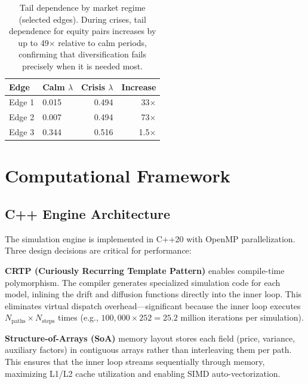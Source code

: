 \documentclass[11pt,a4paper]{article}
\begin{document}
\begin{table}[H]
\centering
\caption{Tail dependence by market regime (selected edges). During crises, tail dependence for equity pairs increases by up to 49$\times$ relative to calm periods, confirming that diversification fails precisely when it is needed most.}
\label{tab:regime_copula}
\small
\begin{tabular}{@{}llrr@{}}
\toprule
\textbf{Edge} & \textbf{Calm $\lambda$} & \textbf{Crisis $\lambda$} & \textbf{Increase} \\
\midrule
Edge 1 & 0.015 & 0.494 & 33$\times$ \\
Edge 2 & 0.007 & 0.494 & 73$\times$ \\
Edge 3 & 0.344 & 0.516 & 1.5$\times$ \\
\bottomrule
\end{tabular}
\end{table}


\section{Computational Framework}
\label{sec:engine}

\subsection{C++ Engine Architecture}
\label{sec:cpp}

The simulation engine is implemented in C++20 with OpenMP parallelization.
Three design decisions are critical for performance:

\textbf{CRTP (Curiously Recurring Template Pattern)} enables compile-time polymorphism.
The compiler generates specialized simulation code for each model, inlining the drift and diffusion functions directly into the inner loop.
This eliminates virtual dispatch overhead---significant because the inner loop executes $N_{\text{paths}} \times N_{\text{steps}}$ times (e.g., $100{,}000 \times 252 = 25.2$ million iterations per simulation).

\textbf{Structure-of-Arrays (SoA)} memory layout stores each field (price, variance, auxiliary factors) in contiguous arrays rather than interleaving them per path.
This ensures that the inner loop streams sequentially through memory, maximizing L1/L2 cache utilization and enabling SIMD auto-vectorization.
\end{document}
